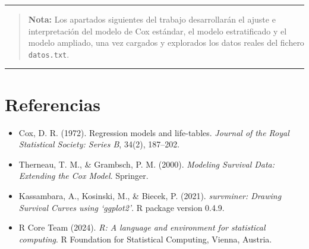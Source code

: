 \documentclass[
]{article}
\providecommand{\tightlist}{%
  \setlength{\itemsep}{0pt}\setlength{\parskip}{0pt}}
\begin{document}
\begin{center}\rule{0.5\linewidth}{0.5pt}\end{center}

\begin{quote}
\textbf{Nota:} Los apartados siguientes del trabajo desarrollarán el
ajuste e interpretación del modelo de Cox estándar, el modelo
estratificado y el modelo ampliado, una vez cargados y explorados los
datos reales del fichero \texttt{datos.txt}.
\end{quote}

\begin{center}\rule{0.5\linewidth}{0.5pt}\end{center}

\hypertarget{referencias}{%
\section{Referencias}\label{referencias}}

\begin{itemize}
\tightlist
\item
  Cox, D. R. (1972). Regression models and life-tables. \emph{Journal of
  the Royal Statistical Society: Series B}, 34(2), 187--202.
\item
  Therneau, T. M., \& Grambsch, P. M. (2000). \emph{Modeling Survival
  Data: Extending the Cox Model}. Springer.
\item
  Kassambara, A., Kosinski, M., \& Biecek, P. (2021). \emph{survminer:
  Drawing Survival Curves using `ggplot2'}. R package version 0.4.9.
\item
  R Core Team (2024). \emph{R: A language and environment for
  statistical computing}. R Foundation for Statistical Computing,
  Vienna, Austria.
\end{itemize}
\end{document}
